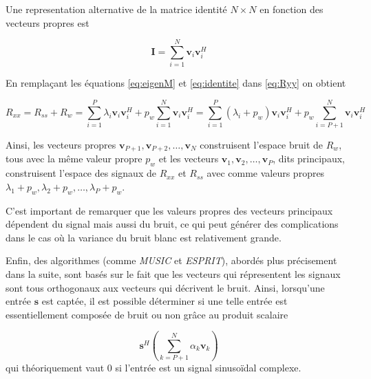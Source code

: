 \documentclass{article}
\begin{document}
Une representation alternative de la matrice identité \(N \times N\) en fonction des vecteurs propres est

\begin{equation}
\label{eq:identite}
\boldsymbol{I}=\sum_{i=1}^{N} \boldsymbol{v}_{i} \boldsymbol{v}_{i}^H
\end{equation}
 
En remplaçant les équations \ref{eq:eigenM} et \ref{eq:identite} dans \ref{eq:Ryy} on obtient

\begin{equation}
%
    \label{eq:RyyEigen}
    R_{xx}= R_{ss} + R_w =\sum_{i=1}^{P}\lambda _i \boldsymbol{v}_{i} \boldsymbol{v}_{i}^H + p_w\sum_{i=1}^{N} \boldsymbol{v}_{i} \boldsymbol{v}_{i}^H = \sum_{i=1}^{P}(\lambda _i + p_w) \boldsymbol{v}_{i} \boldsymbol{v}_{i}^H + p_w\sum_{i=P+1}^{N} \boldsymbol{v}_{i} \boldsymbol{v}_{i}^H
%
\end{equation} 

Ainsi, les vecteurs propres \(\boldsymbol{v}_{P+1}, \boldsymbol{v}_{P+2}, \hdots, \boldsymbol{v}_{N} \) construisent l'espace bruit de \(R_w\), tous avec la même valeur propre \(p_w\) et les vecteurs \(\boldsymbol{v}_{1}, \boldsymbol{v}_{2}, \hdots, \boldsymbol{v}_{P} \), dits principaux, construisent l'espace des signaux de \(R_{xx}\) et \(R_{ss}\) avec comme valeurs propres \(\lambda _1 + p_w, \lambda _2 + p_w, \hdots, \lambda _P + p_w\). 

\vspace*{10pt}

C'est important de remarquer que les valeurs propres des vecteurs principaux dépendent du signal mais aussi du bruit, ce qui peut générer des complications dans le cas où la variance du bruit blanc est relativement grande.

\vspace*{10pt}

Enfin, des algorithmes (comme \textit{MUSIC} et \textit{ESPRIT}), abordés plus précisement dans la suite, sont basés sur le fait que les vecteurs qui répresentent les signaux sont tous orthogonaux aux vecteurs qui décrivent le bruit. Ainsi, lorsqu'une entrée \(\boldsymbol{s}\) est captée, il est possible déterminer si une telle entrée est essentiellement composée de bruit ou non grâce au produit scalaire

\begin{equation}
    \label{eq:produit}
    \boldsymbol{s}^H \left( \sum_{k=P+1}^{N} \alpha _k  \boldsymbol{v}_k \right)
\end{equation}
qui théoriquement vaut 0 si l'entrée est un signal sinusoïdal complexe.
\end{document}
